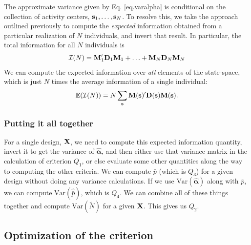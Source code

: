 The approximate variance given by Eq. \ref{eq.varalpha}
is conditional on the collection of activity centers, ${\bf
  s}_{1},\ldots,{\bf s}_{N}$. To resolve this, we take the approach
outlined previously to compute the {\it expected} information obtained
from a particular realization of $N$ individuals, and invert that
result. In particular, the total information for all $N$ individuals
is
\[
{\cal I}(N) =  {\bf M}_{1}' {\bf D}_{1} {\bf M}_{1} + \ldots +
{\bf M}_{N}{\bf D}_{N} {\bf M}_{N}
\]
We can compute
the expected information over {\it all} elements of the state-space,
which is just $N$ times the average information of a single
individual:
\[
\mathbb{E}( {\cal I}(N) ) = N  \sum_{{\bf s}}  {\bf M}({\bf s})'{\bf
  D}({\bf s}) {\bf M}({\bf s}).
\]


\subsubsection{Putting it all together}

For a single design, ${\bf X}$, we need
to compute this expected information quantity, invert it to get the
variance of $\hat{\bm \alpha}$, and then either use that variance
matrix in the calculation of criterion $Q_{1}$, or else evaluate some
other quantities along the way to computing the other criteria. 
We can compute $\bar{p}$ (which is $Q_{3}$) for a given design without
doing any variance calculations. 
If we use $\mbox{Var}(\hat{\bm \alpha})$ along with $\bar{p}$, we can
compute $\mbox{Var}(\hat{\bar{p}})$, which is $Q_{4}$. 
We can combine all of these things together and compute
$\mbox{Var}(\tilde{N})$ for a given ${\bf X}$. This gives us $Q_2$. 



\subsection{Optimization of the criterion}
\label{design.sec.exchange}


